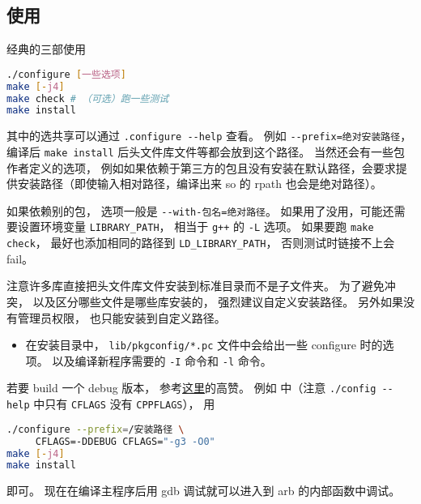 
\begin{issues}
\issueDraft
\end{issues}


\subsection{使用}
经典的三部使用
\begin{lstlisting}[language=bash]
./configure [一些选项]
make [-j4]
make check # （可选）跑一些测试
make install
\end{lstlisting}
其中的选共享可以通过 \verb|.configure --help| 查看。 例如 \verb|--prefix=绝对安装路径|， 编译后 \verb|make install| 后头文件库文件等都会放到这个路径。 当然还会有一些包作者定义的选项， 例如如果依赖于第三方的包且没有安装在默认路径，会要求提供安装路径（即使输入相对路径，编译出来 so 的 rpath 也会是绝对路径）。

如果依赖别的包， 选项一般是 \verb|--with-包名=绝对路径|。 如果用了没用，可能还需要设置环境变量 \verb|LIBRARY_PATH|， 相当于 \verb|g++| 的 \verb|-L| 选项。 如果要跑 \verb|make check|， 最好也添加相同的路径到 \verb|LD_LIBRARY_PATH|， 否则测试时链接不上会 fail。

注意许多库直接把头文件库文件安装到标准目录而不是子文件夹。 为了避免冲突， 以及区分哪些文件是哪些库安装的， 强烈建议自定义安装路径。 另外如果没有管理员权限， 也只能安装到自定义路径。

\begin{itemize}
\item 在安装目录中， \verb|lib/pkgconfig/*.pc| 文件中会给出一些 configure 时的选项。 以及编译新程序需要的 \verb|-I| 命令和 \verb|-l| 命令。
\end{itemize}

若要 build 一个 debug 版本， 参考\href{https://stackoverflow.com/questions/4553735/gnu-autotools-debug-release-targets}{这里}的高赞。 例如  中（注意 \verb|./config --help| 中只有 \verb|CFLAGS| 没有 \verb|CPPFLAGS|）， 用
\begin{lstlisting}[language=bash]
./configure --prefix=/安装路径 \
     CFLAGS=-DDEBUG CFLAGS="-g3 -O0"
make [-j4]
make install
\end{lstlisting}
即可。 现在在编译主程序后用 gdb 调试就可以进入到 arb 的内部函数中调试。


